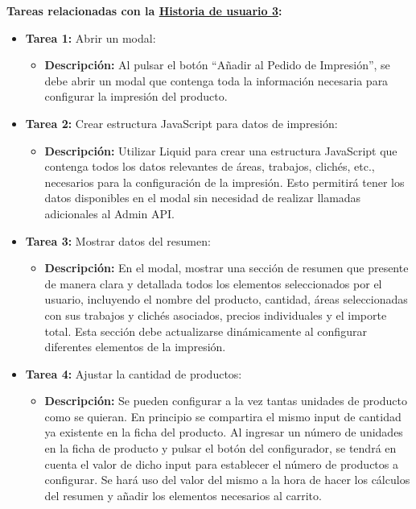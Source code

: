\documentclass[12pt]{article}
\begin{document}
\textbf{Tareas relacionadas con la \hyperref[sec:historia3]{Historia de usuario 3}:}
\begin{itemize}
    \item \textbf{Tarea 1:} Abrir un modal:
          \begin{itemize}[label=--]
              \item \textbf{Descripción:} Al pulsar el botón ``Añadir al Pedido de Impresión'', se debe abrir un modal que contenga toda la información necesaria para configurar la impresión del producto.
          \end{itemize}
    \item \textbf{Tarea 2:} Crear estructura JavaScript para datos de impresión:
          \begin{itemize}[label=--]
              \item \textbf{Descripción:} Utilizar Liquid para crear una estructura JavaScript que contenga todos los datos relevantes de áreas, trabajos, clichés, etc., necesarios para la configuración de la impresión. Esto permitirá tener los datos disponibles en el modal sin necesidad de realizar llamadas adicionales al Admin API.
          \end{itemize}
    \item \textbf{Tarea 3:} Mostrar datos del resumen:
          \begin{itemize}[label=--]
              \item \textbf{Descripción:} En el modal, mostrar una sección de resumen que presente de manera clara y detallada todos los elementos seleccionados por el usuario, incluyendo el nombre del producto, cantidad, áreas seleccionadas con sus trabajos y clichés asociados, precios individuales y el importe total. Esta sección debe actualizarse dinámicamente al configurar diferentes elementos de la impresión.
          \end{itemize}
    \item \textbf{Tarea 4:} Ajustar la cantidad de productos:
          \begin{itemize}[label=--]
              \item \textbf{Descripción:} Se pueden configurar a la vez tantas unidades de producto como se quieran. En principio se compartira el mismo input de cantidad ya existente en la ficha del producto. Al ingresar un número de unidades en la ficha de producto y pulsar el botón del configurador, se tendrá en cuenta el valor de dicho input para establecer el número de productos a configurar. Se hará uso del valor del mismo a la hora de hacer los cálculos del resumen y añadir los elementos necesarios al carrito.

\end{itemize}
\end{itemize}
\end{document}

